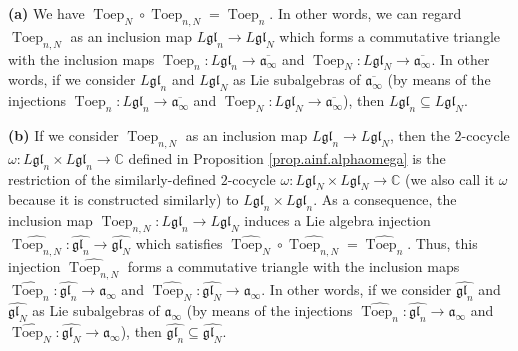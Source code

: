 \documentclass[etingof-lie.tex]{subfiles}
\begin{document}
\begin{proposition}
\textbf{(a)} We have $\operatorname*{Toep}\nolimits_{N}\circ
\operatorname*{Toep}\nolimits_{n,N}=\operatorname*{Toep}\nolimits_{n}$. In
other words, we can regard $\operatorname*{Toep}\nolimits_{n,N}$ as an
inclusion map $L\mathfrak{gl}_{n}\rightarrow L\mathfrak{gl}_{N}$ which forms a
commutative triangle with the inclusion maps $\operatorname*{Toep}%
\nolimits_{n}:L\mathfrak{gl}_{n}\rightarrow\overline{\mathfrak{a}_{\infty}}$
and $\operatorname*{Toep}\nolimits_{N}:L\mathfrak{gl}_{N}\rightarrow
\overline{\mathfrak{a}_{\infty}}$. In other words, if we consider
$L\mathfrak{gl}_{n}$ and $L\mathfrak{gl}_{N}$ as Lie subalgebras of
$\overline{\mathfrak{a}_{\infty}}$ (by means of the injections
$\operatorname*{Toep}\nolimits_{n}:L\mathfrak{gl}_{n}\rightarrow
\overline{\mathfrak{a}_{\infty}}$ and $\operatorname*{Toep}\nolimits_{N}%
:L\mathfrak{gl}_{N}\rightarrow\overline{\mathfrak{a}_{\infty}}$), then
$L\mathfrak{gl}_{n}\subseteq L\mathfrak{gl}_{N}$.

\textbf{(b)} If we consider $\operatorname*{Toep}\nolimits_{n,N}$ as an
inclusion map $L\mathfrak{gl}_{n}\rightarrow L\mathfrak{gl}_{N}$, then the
$2$-cocycle $\omega:L\mathfrak{gl}_{n}\times L\mathfrak{gl}_{n}\rightarrow
\mathbb{C}$ defined in Proposition \ref{prop.ainf.alphaomega} is the
restriction of the similarly-defined $2$-cocycle $\omega:L\mathfrak{gl}%
_{N}\times L\mathfrak{gl}_{N}\rightarrow\mathbb{C}$ (we also call it $\omega$
because it is constructed similarly) to $L\mathfrak{gl}_{n}\times
L\mathfrak{gl}_{n}$. As a consequence, the inclusion map $\operatorname*{Toep}%
\nolimits_{n,N}:L\mathfrak{gl}_{n}\rightarrow L\mathfrak{gl}_{N}$ induces a
Lie algebra injection $\widehat{\operatorname*{Toep}\nolimits_{n,N}%
}:\widehat{\mathfrak{gl}_{n}}\rightarrow\widehat{\mathfrak{gl}_{N}}$ which
satisfies $\widehat{\operatorname*{Toep}\nolimits_{N}}\circ
\widehat{\operatorname*{Toep}\nolimits_{n,N}}=\widehat{\operatorname*{Toep}%
\nolimits_{n}}$. Thus, this injection $\widehat{\operatorname*{Toep}%
\nolimits_{n,N}}$ forms a commutative triangle with the inclusion maps
$\widehat{\operatorname*{Toep}\nolimits_{n}}:\widehat{\mathfrak{gl}_{n}%
}\rightarrow\mathfrak{a}_{\infty}$ and $\widehat{\operatorname*{Toep}%
\nolimits_{N}}:\widehat{\mathfrak{gl}_{N}}\rightarrow\mathfrak{a}_{\infty}$.
In other words, if we consider $\widehat{\mathfrak{gl}_{n}}$ and
$\widehat{\mathfrak{gl}_{N}}$ as Lie subalgebras of $\mathfrak{a}_{\infty}$
(by means of the injections $\widehat{\operatorname*{Toep}\nolimits_{n}%
}:\widehat{\mathfrak{gl}_{n}}\rightarrow\mathfrak{a}_{\infty}$ and
$\widehat{\operatorname*{Toep}\nolimits_{N}}:\widehat{\mathfrak{gl}_{N}%
}\rightarrow\mathfrak{a}_{\infty}$), then $\widehat{\mathfrak{gl}_{n}%
}\subseteq\widehat{\mathfrak{gl}_{N}}$.
\end{proposition}
\end{document}
